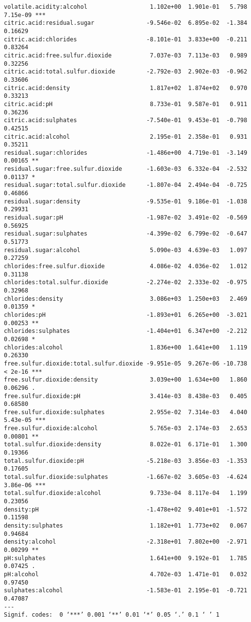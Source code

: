 \documentclass{jsarticle}
\begin{document}
\begin{verbatim}
volatile.acidity:alcohol                  1.102e+00  1.901e-01   5.798 7.15e-09 ***
citric.acid:residual.sugar               -9.546e-02  6.895e-02  -1.384  0.16629    
citric.acid:chlorides                    -8.101e-01  3.833e+00  -0.211  0.83264    
citric.acid:free.sulfur.dioxide           7.037e-03  7.113e-03   0.989  0.32256    
citric.acid:total.sulfur.dioxide         -2.792e-03  2.902e-03  -0.962  0.33606    
citric.acid:density                       1.817e+02  1.874e+02   0.970  0.33213    
citric.acid:pH                            8.733e-01  9.587e-01   0.911  0.36236    
citric.acid:sulphates                    -7.540e-01  9.453e-01  -0.798  0.42515    
citric.acid:alcohol                       2.195e-01  2.358e-01   0.931  0.35211    
residual.sugar:chlorides                 -1.486e+00  4.719e-01  -3.149  0.00165 ** 
residual.sugar:free.sulfur.dioxide       -1.603e-03  6.332e-04  -2.532  0.01137 *  
residual.sugar:total.sulfur.dioxide      -1.807e-04  2.494e-04  -0.725  0.46866    
residual.sugar:density                   -9.535e-01  9.186e-01  -1.038  0.29931    
residual.sugar:pH                        -1.987e-02  3.491e-02  -0.569  0.56925    
residual.sugar:sulphates                 -4.399e-02  6.799e-02  -0.647  0.51773    
residual.sugar:alcohol                    5.090e-03  4.639e-03   1.097  0.27259    
chlorides:free.sulfur.dioxide             4.086e-02  4.036e-02   1.012  0.31138    
chlorides:total.sulfur.dioxide           -2.274e-02  2.333e-02  -0.975  0.32968    
chlorides:density                         3.086e+03  1.250e+03   2.469  0.01359 *  
chlorides:pH                             -1.893e+01  6.265e+00  -3.021  0.00253 ** 
chlorides:sulphates                      -1.404e+01  6.347e+00  -2.212  0.02698 *  
chlorides:alcohol                         1.836e+00  1.641e+00   1.119  0.26330    
free.sulfur.dioxide:total.sulfur.dioxide -9.951e-05  9.267e-06 -10.738  < 2e-16 ***
free.sulfur.dioxide:density               3.039e+00  1.634e+00   1.860  0.06296 .  
free.sulfur.dioxide:pH                    3.414e-03  8.438e-03   0.405  0.68580    
free.sulfur.dioxide:sulphates             2.955e-02  7.314e-03   4.040 5.43e-05 ***
free.sulfur.dioxide:alcohol               5.765e-03  2.174e-03   2.653  0.00801 ** 
total.sulfur.dioxide:density              8.022e-01  6.171e-01   1.300  0.19366    
total.sulfur.dioxide:pH                  -5.218e-03  3.856e-03  -1.353  0.17605    
total.sulfur.dioxide:sulphates           -1.667e-02  3.605e-03  -4.624 3.86e-06 ***
total.sulfur.dioxide:alcohol              9.733e-04  8.117e-04   1.199  0.23056    
density:pH                               -1.478e+02  9.401e+01  -1.572  0.11598    
density:sulphates                         1.182e+01  1.773e+02   0.067  0.94684    
density:alcohol                          -2.318e+01  7.802e+00  -2.971  0.00299 ** 
pH:sulphates                              1.641e+00  9.192e-01   1.785  0.07425 .  
pH:alcohol                                4.702e-03  1.471e-01   0.032  0.97450    
sulphates:alcohol                        -1.583e-01  2.195e-01  -0.721  0.47087    
---
Signif. codes:  0 ‘***’ 0.001 ‘**’ 0.01 ‘*’ 0.05 ‘.’ 0.1 ‘ ’ 1


\end{verbatim}
\end{document}

